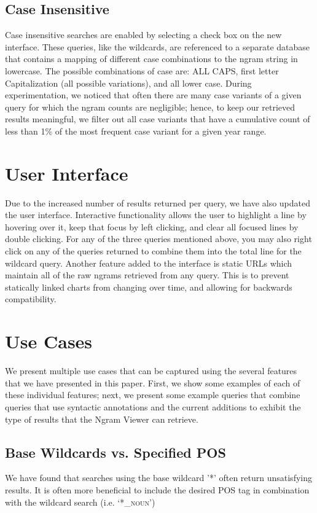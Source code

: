 \documentclass[11pt]{article}
\begin{document}
\subsection{Case Insensitive}
Case insensitive searches are enabled by selecting a check box on the new interface. These queries, like the wildcards, are referenced to a separate database that contains a mapping of different case combinations to the ngram string in lowercase. The possible combinations of case are: ALL CAPS, first letter Capitalization (all possible variations), and all lower case. During experimentation, we noticed that often there are many case variants of a given query for which the ngram counts are negligible; hence, to keep our retrieved results meaningful, we filter out all case variants that have a cumulative count of less than 1\% of the most frequent case variant for a given year range.



\section{User Interface}
\label{sec:interface}
Due to the increased number of results returned per query, we have also updated the user interface. Interactive functionality allows the user to highlight a line by hovering over it, keep that focus by left clicking, and clear all focused lines by double clicking. For any of the three queries mentioned above, you may also right click on any of the queries returned to combine them into the total line for the wildcard query. Another feature added to the interface is static URLs which maintain all of the raw ngrams retrieved from any query. This is to prevent statically linked charts from changing over time, and allowing for backwards compatibility.


\section{Use Cases}
\label{sec:usecases}
We present multiple use cases that can be captured using the several features that we have presented in this paper. First, we show some examples of each of these individual features; next, we present some example queries that combine queries that use syntactic annotations and the current additions to exhibit the type of results that the Ngram Viewer can retrieve.

\subsection{Base Wildcards vs. Specified POS}
We have found that searches using the base wildcard '*' often return unsatisfying results. It is often more beneficial to include the desired POS tag in combination with the wildcard search (i.e. `*\textsf{\textsc{\_noun}}')
\end{document}
